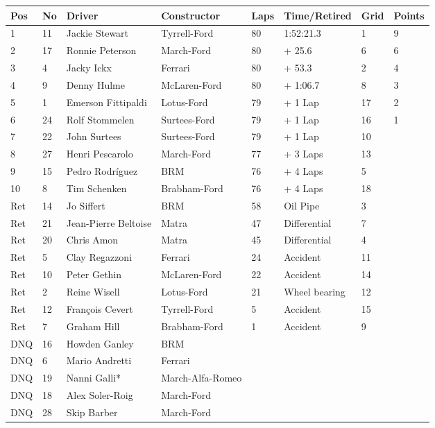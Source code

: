 \documentclass{article}
\begin{document}
\begin{tabular}{llllllll}
\toprule
Pos & No & Driver & Constructor & Laps & Time/Retired & Grid & Points \\
\midrule
1 & 11 & Jackie Stewart & Tyrrell-Ford & 80 & 1:52:21.3 & 1 & 9 \\
2 & 17 & Ronnie Peterson & March-Ford & 80 & + 25.6 & 6 & 6 \\
3 & 4 & Jacky Ickx & Ferrari & 80 & + 53.3 & 2 & 4 \\
4 & 9 & Denny Hulme & McLaren-Ford & 80 & + 1:06.7 & 8 & 3 \\
5 & 1 & Emerson Fittipaldi & Lotus-Ford & 79 & + 1 Lap & 17 & 2 \\
6 & 24 & Rolf Stommelen & Surtees-Ford & 79 & + 1 Lap & 16 & 1 \\
7 & 22 & John Surtees & Surtees-Ford & 79 & + 1 Lap & 10 &  \\
8 & 27 & Henri Pescarolo & March-Ford & 77 & + 3 Laps & 13 &  \\
9 & 15 & Pedro Rodríguez & BRM & 76 & + 4 Laps & 5 &  \\
10 & 8 & Tim Schenken & Brabham-Ford & 76 & + 4 Laps & 18 &  \\
Ret & 14 & Jo Siffert & BRM & 58 & Oil Pipe & 3 &  \\
Ret & 21 & Jean-Pierre Beltoise & Matra & 47 & Differential & 7 &  \\
Ret & 20 & Chris Amon & Matra & 45 & Differential & 4 &  \\
Ret & 5 & Clay Regazzoni & Ferrari & 24 & Accident & 11 &  \\
Ret & 10 & Peter Gethin & McLaren-Ford & 22 & Accident & 14 &  \\
Ret & 2 & Reine Wisell & Lotus-Ford & 21 & Wheel bearing & 12 &  \\
Ret & 12 & François Cevert & Tyrrell-Ford & 5 & Accident & 15 &  \\
Ret & 7 & Graham Hill & Brabham-Ford & 1 & Accident & 9 &  \\
DNQ & 16 & Howden Ganley & BRM &  &  &  &  \\
DNQ & 6 & Mario Andretti & Ferrari &  &  &  &  \\
DNQ & 19 & Nanni Galli* & March-Alfa-Romeo &  &  &  &  \\
DNQ & 18 & Alex Soler-Roig & March-Ford &  &  &  &  \\
DNQ & 28 & Skip Barber & March-Ford &  &  &  &  \\
\bottomrule
\end{tabular}
\end{document}
